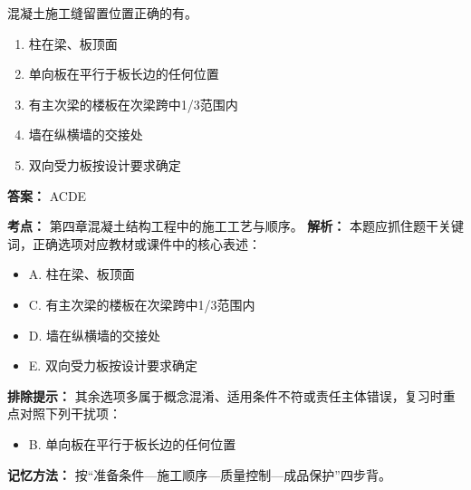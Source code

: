 \documentclass[UTF8,fontset=fandol,11pt]{ctexart}
\begin{document}
\begin{quizbox}[title={第 75 题}]
混凝土施工缝留置位置正确的有。\\
\begin{enumerate}[label=\Alph*.]
\item 柱在梁、板顶面
\item 单向板在平行于板长边的任何位置
\item 有主次梁的楼板在次梁跨中1/3范围内
\item 墙在纵横墙的交接处
\item 双向受力板按设计要求确定
\end{enumerate}
\textbf{答案：} ACDE
\vspace{0.25em}
\begin{answerbox}[title={考点解析}]
\textbf{考点：} 第四章混凝土结构工程中的施工工艺与顺序。
\textbf{解析：} 本题应抓住题干关键词，正确选项对应教材或课件中的核心表述：
\begin{itemize}
\item A. 柱在梁、板顶面
\item C. 有主次梁的楼板在次梁跨中1/3范围内
\item D. 墙在纵横墙的交接处
\item E. 双向受力板按设计要求确定
\end{itemize}
\textbf{排除提示：} 其余选项多属于概念混淆、适用条件不符或责任主体错误，复习时重点对照下列干扰项：
\begin{itemize}
\item B. 单向板在平行于板长边的任何位置
\end{itemize}
\textbf{记忆方法：} 按“准备条件—施工顺序—质量控制—成品保护”四步背。
\end{answerbox}
\end{quizbox}
\end{document}
